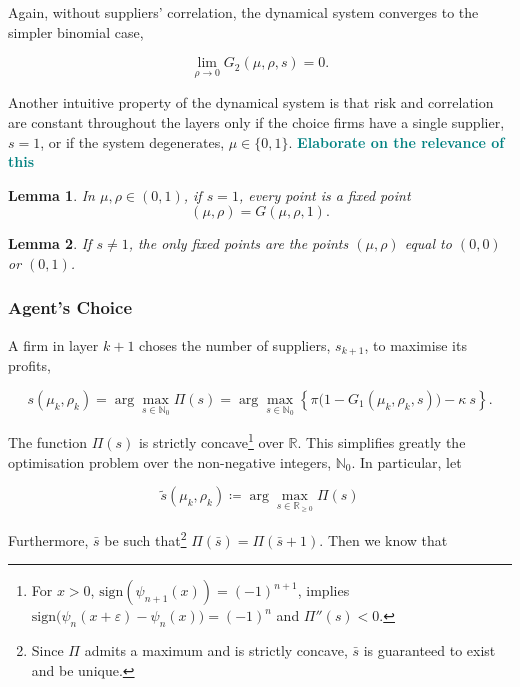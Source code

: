 \documentclass[american, abstract=on]{scrartcl}
\theoremstyle{plain}
\newtheorem{lemma}{Lemma}
\renewcommand{\Re}{\mathbb{R}}
\newcommand\notes[1]{\textcolor{teal}{\footnotesize \textbf{#1}}}
\begin{document}
Again, without suppliers' correlation, the dynamical system converges to the simpler binomial case,

\begin{equation}
  \lim_{\rho \rightarrow 0} G_2(\mu, \rho, s) = 0.
\end{equation}

Another intuitive property of the dynamical system is that risk and correlation are constant throughout the layers only if the choice firms have a single supplier, $s = 1$, or if the system degenerates, $\mu \in \{0, 1\}$. \notes{Elaborate on the relevance of this}

\begin{lemma}
  In $\mu, \rho \in (0, 1)$, if $s = 1$, every point is a fixed point \begin{equation}
    (\mu, \rho) = G(\mu, \rho, 1). 
  \end{equation}
\end{lemma}

\begin{lemma}
  If $s \neq 1$, the only fixed points are the points $(\mu, \rho)$ equal to $(0, 0)$  or $(0, 1)$.
\end{lemma}

\subsubsection{Agent's Choice}

A firm in layer $k + 1$ choses the number of suppliers, $s_{k + 1}$, to maximise its profits, 

\begin{equation}
  s(\mu_k, \rho_k) = \arg\max_{s \in \mathbb{N}_0} \Pi(s) = \arg\max_{s \in \mathbb{N}_0} \left\{ \pi \Big(1 - G_1(\mu_k, \rho_k, s)\Big) - \kappa \  s \right\}.
\end{equation}

The function $\Pi(s)$ is strictly concave\footnote{
  For $x > 0$, $\text{sign}(\psi_{n + 1}(x)) = (-1)^{n + 1}$, implies $\text{sign}\big(\psi_n(x + \varepsilon) - \psi_n(x) \big) = (-1)^n$ and $\Pi''(s) < 0$.
} over $\Re$. This simplifies greatly the optimisation problem over the non-negative integers, $\mathbb{N}_0$. In particular, let

\begin{equation}
  \tilde{s}(\mu_k, \rho_k) \coloneqq \arg\max_{s \in \mathbb{R}_{\geq 0}} \Pi(s)
\end{equation}


Furthermore, $\bar{s}$ be such that\footnote{Since $\Pi$ admits a maximum and is strictly concave, $\bar{s}$ is guaranteed to exist and be unique.} $\Pi(\bar{s}) = \Pi(\bar{s} + 1)$. Then we know that 
\end{document}
